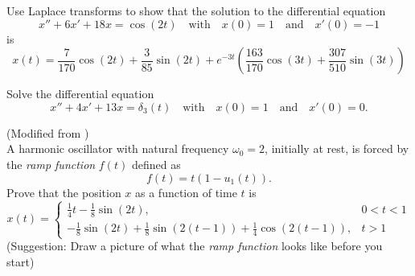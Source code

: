 \begin{problem}
    Use Laplace transforms to show that the solution to the differential equation
    \[ x'' + 6x' + 18x = \cos(2t) \quad \text{with} \quad x(0) = 1 \quad \text{and} \quad x'(0) =
    -1 \]
    is
    \[ x(t) = \frac{7}{170} \cos(2t) + \frac{3}{85} \sin(2t) + e^{-3t} \left(
        \frac{163}{170} \cos(3t) + \frac{307}{510} \sin(3t)
    \right) \]
\end{problem}

\begin{problem}
    Solve the differential equation
    \[ x'' +4x' + 13x = \delta_3(t)  \quad \text{with} \quad x(0)=1 \quad \text{and} \quad
    x'(0) =0. \]
\end{problem}


\begin{problem}
    (Modified from \cite{Noonburg}) \\
    A harmonic oscillator with natural frequency $\omega_0 = 2$, initially at rest, is
    forced by the {\it ramp function} $f(t)$ defined as
    \[ f(t) = t(1 - u_1(t)). \]
    Prove that the position $x$ as a function of time $t$ is 
    \[ x(t) = \left\{ \begin{array}{ll} \frac{1}{4} t - \frac{1}{8} \sin(2t), & 0 < t < 1 \\
                -\frac{1}{8} \sin(2t) + \frac{1}{8} \sin(2(t-1)) + \frac{1}{4}
                \cos(2(t-1)), & t > 1
    \end{array}  \right. \]
    (Suggestion: Draw a picture of what the {\it ramp function} looks like before you
    start)
\end{problem}


